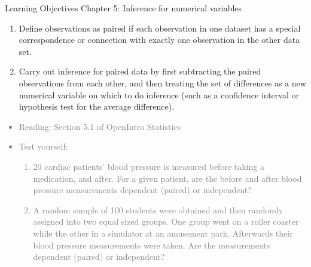 \documentclass[11pt]{article}
\newcommand{\gray}[1]{\textcolor{gray}{#1}}
\begin{document}
{\LARGE \textcolor{oiB}{Learning Objectives \hfill Chapter 5: Inference for numerical variables}} \\

%

\begin{enumerate}
\renewcommand\labelenumi{\textcolor{light}{\textbf{LO \theenumi.}}}

\item Define observations as paired if each observation in one dataset has a special correspondence or connection with exactly one observation in the other data set.

\item Carry out inference for paired data by first subtracting the paired observations from each other, and then treating the set of differences as a new numerical variable on which to do inference (such as a confidence interval or hypothesis test for the average difference).

\end{enumerate}

\gray{
{\it
\vspace{-0.55cm}
\begin{itemize}
\renewcommand{\labelitemi}{{\textcolor{dark}{$\ast$}}}
\item Reading: Section 5.1 of OpenIntro Statistics
\item Test yourself:
\begin{enumerate}
\item 20 cardiac patients' blood pressure is measured before taking a medication, and after. For a given patient, are the before and after blood pressure measurements dependent (paired) or independent?
\item A random sample of 100 students were obtained and then randomly assigned into two equal sized groups. One group went on a roller coaster while the other in a simulator at an amusement park. Afterwards their blood pressure measurements were taken. Are the measurements dependent (paired) or independent?
\end{enumerate}
\end{itemize}
}}


%

\vspace{0.48cm}

%
\end{document}
